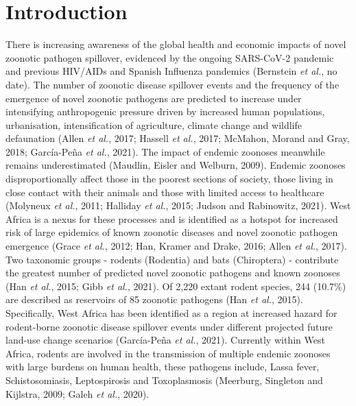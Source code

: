 \documentclass[
]{article}
\begin{document}
\hypertarget{introduction}{%
\section{Introduction}\label{introduction}}

There is increasing awareness of the global health and economic impacts
of novel zoonotic pathogen spillover, evidenced by the ongoing
SARS-CoV-2 pandemic and previous HIV/AIDs and Spanish Influenza
pandemics (Bernstein \emph{et al.}, no date). The number of zoonotic
disease spillover events and the frequency of the emergence of novel
zoonotic pathogens are predicted to increase under intensifying
anthropogenic pressure driven by increased human populations,
urbanisation, intensification of agriculture, climate change and
wildlife defaunation (Allen \emph{et al.}, 2017; Hassell \emph{et al.},
2017; McMahon, Morand and Gray, 2018; García-Peña \emph{et al.}, 2021).
The impact of endemic zoonoses meanwhile remains underestimated
(Maudlin, Eisler and Welburn, 2009). Endemic zoonoses disproportionally
affect those in the poorest sections of society, those living in close
contact with their animals and those with limited access to healthcare
(Molyneux \emph{et al.}, 2011; Halliday \emph{et al.}, 2015; Judson and
Rabinowitz, 2021). West Africa is a nexus for these processes and is
identified as a hotspot for increased risk of large epidemics of known
zoonotic diseases and novel zoonotic pathogen emergence (Grace \emph{et
al.}, 2012; Han, Kramer and Drake, 2016; Allen \emph{et al.}, 2017). Two
taxonomic groups - rodents (Rodentia) and bats (Chiroptera) - contribute
the greatest number of predicted novel zoonotic pathogens and known
zoonoses (Han \emph{et al.}, 2015; Gibb \emph{et al.}, 2021). Of 2,220
extant rodent species, 244 (10.7\%) are described as reservoirs of 85
zoonotic pathogens (Han \emph{et al.}, 2015). Specifically, West Africa
has been identified as a region at increased hazard for rodent-borne
zoonotic disease spillover events under different projected future
land-use change scenarios (García-Peña \emph{et al.}, 2021). Currently
within West Africa, rodents are involved in the transmission of multiple
endemic zoonoses with large burdens on human health, these pathogens
include, Lassa fever, Schistosomiasis, Leptospirosis and Toxoplasmosis
(Meerburg, Singleton and Kijlstra, 2009; Galeh \emph{et al.}, 2020).
\end{document}
